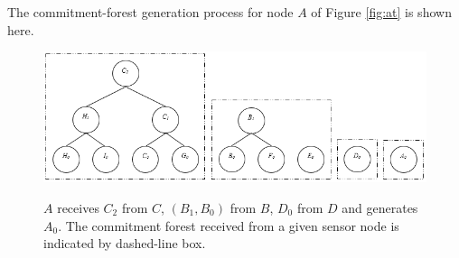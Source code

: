 			\begin{exmp} The commitment-forest generation process for node $A$ of Figure \ref{fig:at} is shown here.\\
				\begin{figure}[h!]
					\centering
					\includegraphics[scale = 0.9]{images/commitment-tree-example-1-shia.png}\\
					\caption{$A$ receives $C_{2}$ from $C$, $(B_{1},B_{0})$ from $B$, $D_{0}$ from $D$ and generates $A_{0}$. The commitment forest received from a given sensor node is indicated by dashed-line box.}
					\label{fig:commitment-tree-example-1-shia}
				\end{figure}\\


\end{exmp}
